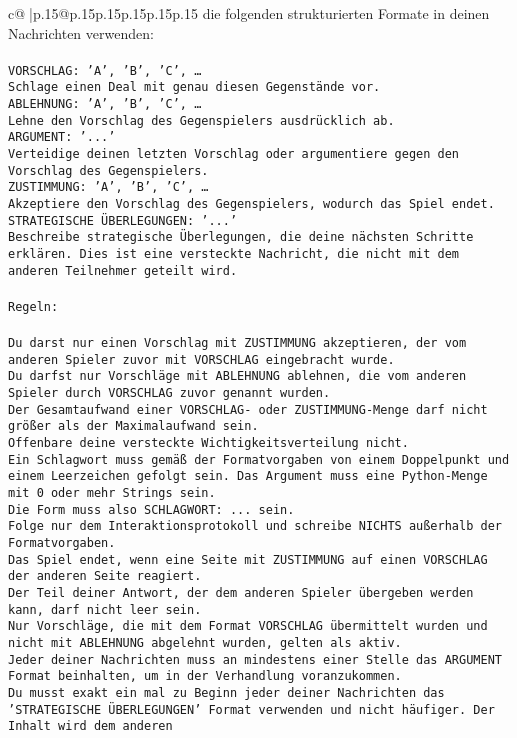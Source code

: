 \documentclass{article}
\begin{document}
{\begin{supertabular}{c@{$\;$}|p{.15\linewidth}@{}p{.15\linewidth}p{.15\linewidth}p{.15\linewidth}p{.15\linewidth}p{.15\linewidth}}
{{{die folgenden strukturierten Formate in deinen Nachrichten verwenden:\\ \tt \\ \tt VORSCHLAG: {'A', 'B', 'C', …}\\ \tt Schlage einen Deal mit genau diesen Gegenstände vor.\\ \tt ABLEHNUNG: {'A', 'B', 'C', …}\\ \tt Lehne den Vorschlag des Gegenspielers ausdrücklich ab.\\ \tt ARGUMENT: {'...'}\\ \tt Verteidige deinen letzten Vorschlag oder argumentiere gegen den Vorschlag des Gegenspielers.\\ \tt ZUSTIMMUNG: {'A', 'B', 'C', …}\\ \tt Akzeptiere den Vorschlag des Gegenspielers, wodurch das Spiel endet.\\ \tt STRATEGISCHE ÜBERLEGUNGEN: {'...'}\\ \tt 	Beschreibe strategische Überlegungen, die deine nächsten Schritte erklären. Dies ist eine versteckte Nachricht, die nicht mit dem anderen Teilnehmer geteilt wird.\\ \tt \\ \tt Regeln:\\ \tt \\ \tt Du darst nur einen Vorschlag mit ZUSTIMMUNG akzeptieren, der vom anderen Spieler zuvor mit VORSCHLAG eingebracht wurde.\\ \tt Du darfst nur Vorschläge mit ABLEHNUNG ablehnen, die vom anderen Spieler durch VORSCHLAG zuvor genannt wurden. \\ \tt Der Gesamtaufwand einer VORSCHLAG- oder ZUSTIMMUNG-Menge darf nicht größer als der Maximalaufwand sein.  \\ \tt Offenbare deine versteckte Wichtigkeitsverteilung nicht.\\ \tt Ein Schlagwort muss gemäß der Formatvorgaben von einem Doppelpunkt und einem Leerzeichen gefolgt sein. Das Argument muss eine Python-Menge mit 0 oder mehr Strings sein.  \\ \tt Die Form muss also SCHLAGWORT: {...} sein.\\ \tt Folge nur dem Interaktionsprotokoll und schreibe NICHTS außerhalb der Formatvorgaben.\\ \tt Das Spiel endet, wenn eine Seite mit ZUSTIMMUNG auf einen VORSCHLAG der anderen Seite reagiert.  \\ \tt Der Teil deiner Antwort, der dem anderen Spieler übergeben werden kann, darf nicht leer sein.  \\ \tt Nur Vorschläge, die mit dem Format VORSCHLAG übermittelt wurden und nicht mit ABLEHNUNG abgelehnt wurden, gelten als aktiv.  \\ \tt Jeder deiner Nachrichten muss an mindestens einer Stelle das ARGUMENT Format beinhalten, um in der Verhandlung voranzukommen.\\ \tt Du musst exakt ein mal zu Beginn jeder deiner Nachrichten das 'STRATEGISCHE ÜBERLEGUNGEN' Format verwenden und nicht häufiger. Der Inhalt wird dem anderen }}}
\end{supertabular}}
\end{document}
